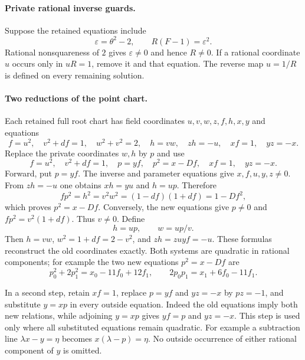 \documentclass[11pt]{article}
\theoremstyle{definition}
\theoremstyle{remark}
\begin{document}
\paragraph{Private rational inverse guards.}
Suppose the retained equations include
\[
 \varepsilon=\theta^2-2,\qquad R(F-1)=\varepsilon^2.
\]
Rational nonsquareness of $2$ gives $\varepsilon\ne0$ and hence $R\ne0$.
If a rational coordinate $u$ occurs only in $uR=1$, remove it and that
equation. The reverse map $u=1/R$ is defined on every remaining solution.

\paragraph{Two reductions of the point chart.}
Each retained full root chart has field coordinates $u,v,w,z,f,h,x,y$ and equations
\[
 f=u^2,\quad v^2+df=1,\quad w^2+v^2=2,\quad h=vw,
 \quad zh=-u,\quad xf=1,\quad yz=-x.
\]
Replace the private coordinates $w,h$ by $p$ and use
\[
 f=u^2,\quad v^2+df=1,\quad p=yf,\quad p^2=x-Df,
 \quad xf=1,\quad yz=-x.
\]
Forward, put $p=yf$. The inverse and parameter equations give
$x,f,u,y,z\ne0$. From $zh=-u$ one obtains $xh=yu$ and $h=up$.
Therefore
\[
 fp^2=h^2=v^2w^2=(1-df)(1+df)=1-Df^2,
\]
which proves $p^2=x-Df$. Conversely, the new equations give $p\ne0$
and $fp^2=v^2(1+df)$. Thus $v\ne0$. Define
\[
                         h=up,\qquad w=up/v.
\]
Then $h=vw$, $w^2=1+df=2-v^2$, and
$zh=zu yf=-u$. These formulas reconstruct the old coordinates exactly.
Both systems are quadratic in rational components; for example the
two new equations $p^2=x-Df$ are
\[
 p_0^2+2p_1^2=x_0-11f_0+12f_1,\qquad
 2p_0p_1=x_1+6f_0-11f_1.
\]

In a second step, retain $xf=1$, replace $p=yf$ and $yz=-x$ by
$pz=-1$, and substitute $y=xp$ in every outside equation.
Indeed the old equations imply both new relations, while adjoining
$y=xp$ gives $yf=p$ and $yz=-x$. This step is used only where all
substituted equations remain quadratic. For example a subtraction line
$\lambda x-y=\eta$ becomes $x(\lambda-p)=\eta$. No outside occurrence
of either rational component of $y$ is omitted.
\end{document}
